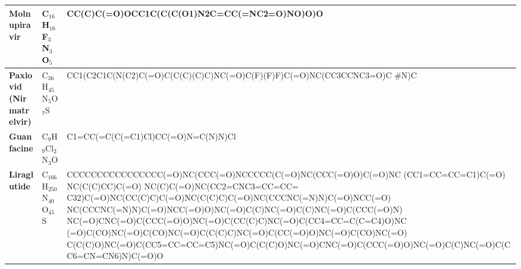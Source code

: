 \documentclass[conference]{IEEEtran}
\begin{document}
\begin{table}[h]
\begin{tabular}{|>{\bfseries}l|l|p{10cm}|}
    \hline
    Molnupiravir                             & C$_{16}$H$_{16}$F$_3$N$_3$O$_5$        & CC(C)C(=O)OCC1C(C(C(O1)N2C=CC(=NC2=O)NO)O)O                                                                                                                                                                                                                                                                                                                                                                                                                                                                                                                                     \\
    \hline
    Paxlovid (Nirmatrelvir)                  & C$_{36}$H$_{45}$N$_5$O$_7$S            & CC1(C2C1C(N(C2)C(=O)C(C(C)(C)C)NC(=O)C(F)(F)F)C(=O)NC(CC3CCNC3=O)C \newline \#N)C                                                                                                                                                                                                                                                                                                                                                                                                                                                                                               \\
    \hline
    Guanfacine                               & C$_{9}$H$_{9}$Cl$_2$N$_3$O             & C1=CC(=C(C(=C1)Cl)CC(=O)N=C(N)N)Cl                                                                                                                                                                                                                                                                                                                                                                                                                                                                                                                                              \\
    \hline
    Liraglutide                              & C$_{166}$H$_{250}$N$_{40}$O$_{45}$S    & CCCCCCCCCCCCCCCC(=O)NC(CCC(=O)NCCCCC(C(=O)NC(CCC(=O)O)C(=O)NC \newline (CC1=CC=CC=C1)C(=O) NC(C(C)CC)C(=O) NC(C)C(=O)NC(CC2=CNC3=CC=CC= \newline C32)C(=O)NC(CC(C)C)C(=O)NC(C(C)C)C(=O)NC(CCCNC(=N)N)C(=O)NCC(=O) \newline NC(CCCNC(=N)N)C(=O)NCC(=O)O)NC(=O)C(C)NC(=O)C(C)NC(=O)C(CCC(=O)N) \newline NC(=O)CNC(=O)C(CCC(=O)O)NC(=O)C(CC(C)C)NC(=O)C(CC4=CC=C(C=C4)O)NC \newline (=O)C(CO)NC(=O)C(CO)NC(=O)C(C(C)C)NC(=O)C(CC(=O)O)NC(=O)C(CO)NC(=O) \newline C(C(C)O)NC(=O)C(CC5=CC=CC=C5)NC(=O)C(C(C)O)NC(=O)CNC(=O)C(CCC(=O)\newline O)NC(=O)C(C)NC(=O)C(CC6=CN=CN6)N)C(=O)O \\

\end{tabular}
\end{table}
\end{document}

